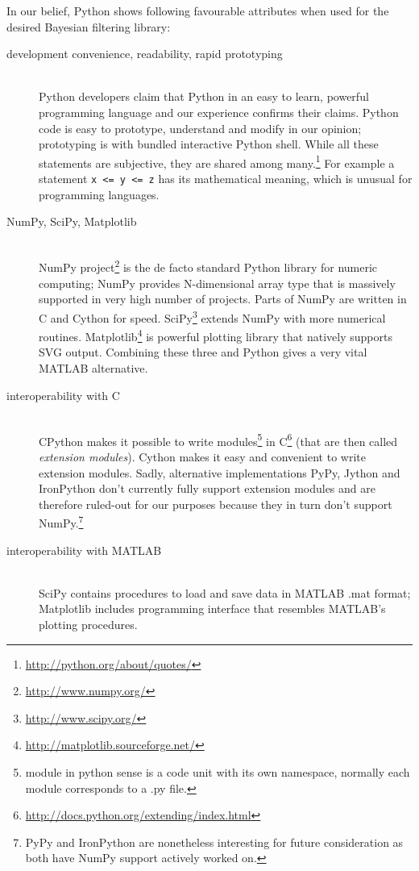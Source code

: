 In our belief, Python shows following favourable attributes when used for the desired Bayesian
filtering library:
\begin{description}
	\item[development convenience, readability, rapid prototyping] \hfill \\
		Python developers claim that Python in an easy to learn, powerful programming language and
		our experience confirms their claims. Python code is easy to prototype, understand and
		modify in our opinion; prototyping is  with bundled interactive Python shell.
		While all these statements are subjective, they are shared among
		many.\footnote{\url{http://python.org/about/quotes/}} For example a statement \verb|x <= y <= z|
		has its mathematical meaning, which is unusual for programming languages.
	\item[NumPy, SciPy, Matplotlib] \hfill \\
		NumPy project\footnote{\url{http://www.numpy.org/}} is the de facto standard Python library for
		numeric computing; NumPy provides N-dimensional array type that is massively supported in
		very high number of projects. Parts of NumPy are written in C and Cython for speed.
		SciPy\footnote{\url{http://www.scipy.org/}} extends NumPy with more numerical routines.
		Matplotlib\footnote{\url{http://matplotlib.sourceforge.net/}} is powerful plotting library
		that natively supports SVG output. Combining these three and Python gives a very vital
		MATLAB alternative.
	\item[interoperability with C] \hfill \\
		CPython makes it possible to write modules\footnote{module in python sense is a code unit with
		its own namespace, normally each module corresponds to a .py file.} in
		C\footnote{\url{http://docs.python.org/extending/index.html}} (that are then called \emph{extension modules}).
		Cython makes it easy and convenient to write extension modules. Sadly, alternative
		implementations PyPy, Jython and IronPython don't currently fully support extension modules
		and are therefore ruled-out for our purposes because they in turn don't support
		NumPy.\footnote{PyPy and IronPython are nonetheless interesting for future consideration as
		both have NumPy support actively worked on.}
	\item[interoperability with MATLAB] \hfill \\
		SciPy contains procedures to load and save data in MATLAB .mat format; Matplotlib includes
		programming interface that resembles MATLAB's plotting procedures.
\end{description}
